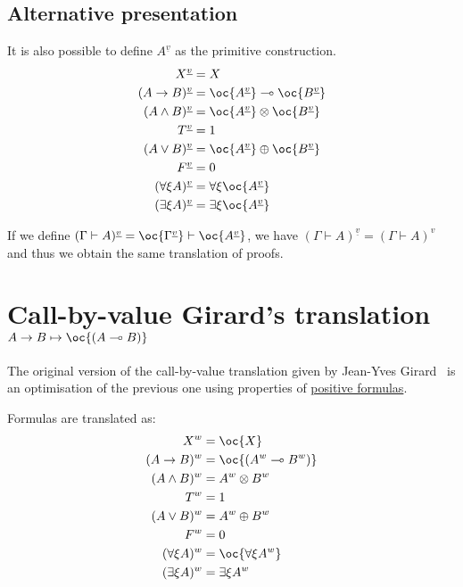 \subsection{Alternative presentation}\label{alternative-presentation-2}

It is also possible to define \(A^{\underline{v}}\) as the primitive construction.
\begin{align*}
X^{\underline{v}} & = X \\
(A\imp B)^{\underline{v}} & = \oc{A^{\underline{v}}}\limp\oc{B^{\underline{v}}} \\
(A\wedge B)^{\underline{v}} & = \oc{A^{\underline{v}}}\tens\oc{B^{\underline{v}}} \\
T^{\underline{v}} & = \one \\
(A\vee B)^{\underline{v}} & = \oc{A^{\underline{v}}}\plus\oc{B^{\underline{v}}} \\
F^{\underline{v}} & = \zero \\
(\forall\xi A)^{\underline{v}} & = \forall\xi \oc{A^{\underline{v}}} \\
(\exists\xi A)^{\underline{v}} & = \exists\xi \oc{A^{\underline{v}}}
\end{align*}

If we define
\((\Gamma\vdash A)^{\underline{v}} = \oc{\Gamma^{\underline{v}}}\vdash\oc{A^{\underline{v}}}\),
we have \((\Gamma\vdash A)^{\underline{v}} = (\Gamma\vdash A)^v\) and
thus we obtain the same translation of proofs.

\section{\texorpdfstring{Call-by-value Girard's translation \(A\imp B \mapsto \oc{(A\limp B)}\)}{Call-by-value Girard's translation A\textbackslash{}imp B \textbackslash{}mapsto \textbackslash{}oc\{(A\textbackslash{}limp B)\}}}\label{call-by-value-girards-translation-aimp-b-mapsto-ocalimp-b}

The original version of the call-by-value translation given by Jean-Yves
Girard~\cite{linearlogic} is an optimisation of the previous one using
properties of \hyperref[positive-formula]{positive formulas}.

Formulas are translated as:
\begin{align*}
X^w & = \oc{X} \\
(A\imp B)^w & = \oc{(A^w\limp B^w)} \\
(A\wedge B)^w & = A^w \tens B^w \\
T^w & = \one \\
(A\vee B)^w & = A^w\plus B^w \\
F^w & = \zero \\
(\forall\xi A)^w & = \oc{\forall\xi A^w} \\
(\exists\xi A)^w & = \exists\xi A^w
\end{align*}

